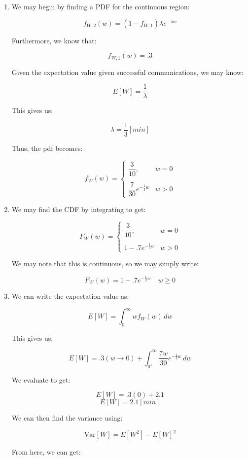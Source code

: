 \begin{enumerate}
\begin{enumerate}
      \item We may begin by finding a PDF for the continuous region:

        $$f_{W,2}(w)=(1-f_{W,1})\lambda e^{-\lambda w}$$

        Furthermore, we know that:

        $$f_{W,1}(w)=.3$$

        Given the expectation value given successful communications, we may know:

        $$E[W]=\frac{1}{\lambda}$$

        This gives us:

        $$\lambda=\frac{1}{3}[\si{min}]$$

        Thus, the pdf becomes:

        $$\boxed{f_{W}(w)=\left\{\begin{array}{ll} \dfrac{3}{10}, & w=0\\\\ \dfrac{7}{30}e^{-\frac{1}{3}w} & w>0 \end{array}}$$

      \item We may find the CDF by integrating to get:

        $$F_{W}(w)=\left\{\begin{array}{ll} \dfrac{3}{10}, & w=0\\\\ 1-.7e^{-\frac{1}{3}w} & w>0 \end{array}$$

        We may note that this is continuous, so we may simply write:

        $$\boxed{F_{W}(w)=1-.7e^{-\frac{1}{3}w}\quad w\geq 0}$$

      \item We can write the expectation value as:

        $$E[W]=\int_{0}^{\infty} wf_W(w)\,dw$$

        This gives us:

        $$E[W]=.3(w\to0)+\int_{0^+}^{\infty} \frac{7w}{30}e^{-\frac{1}{3}w}\,dw$$

        We evaluate to get:

        $$E[W]=.3(0)+2.1$$
        $$\boxed{E[W]=2.1[\si{min}]}$$

        We can then find the variance using:

        $$\text{Var}[W]=E[W^2]-E[W]^2$$

        From here, we can get:


\end{enumerate}
\end{enumerate}
